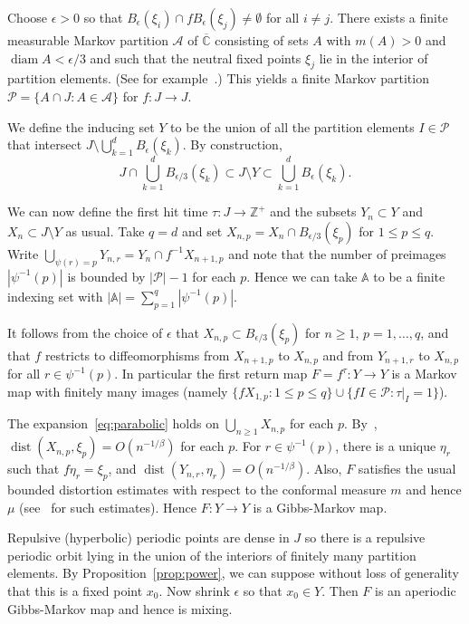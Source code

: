 \documentclass[12pt]{article}
\numberwithin{equation}{section}
\newcommand{\Z}{{\mathbb Z}}
\newcommand{\bbA}{{\mathbb A}}
\newcommand{\bC}{{\overline{\mathbb C}}}
\newcommand{\cA}{\mathcal{A}}
\newcommand{\cP}{\mathcal{P}}
\newcommand{\eps}{\epsilon}
\newcommand{\diam}{\operatorname{diam}}
\newcommand{\dist}{\operatorname{dist}}
\begin{document}
\begin{example}
Choose $\eps>0$ so that $B_\eps(\xi_i)\cap fB_\eps(\xi_j)\neq\emptyset$ for all $i\neq j$.
There exists a finite measurable Markov partition $\cA$ of $\bC$ consisting of sets $A$ with $m(A)>0$ and $\diam A<\eps/3$ and such that 
the neutral fixed points $\xi_j$ lie in the interior of partition elements.
(See for example~\cite[Section~9]{ADU93}.)
This yields a finite Markov partition $\cP=\{A\cap J: A\in\cA\}$ for $f:J\to J$.

We define the inducing set $Y$ to be the union of all the partition elements $I\in\cP$ that intersect
$J\setminus\bigcup_{k=1}^d B_\eps(\xi_k)$.
By construction, 
\[
J\cap \bigcup_{k=1}^d B_{\eps/3}(\xi_k)\subset J\setminus Y
\subset\bigcup_{k=1}^d B_\eps(\xi_k).
\]

We can now define the first hit time $\tau:J\to\Z^+$ and the subsets
$Y_n\subset Y$ and $X_n\subset J\setminus Y$ as usual.
Take $q=d$ and set
$X_{n,p}=X_n\cap B_{\eps/3}(\xi_p)$ for $1\le p\le q$.
Write 
  $\bigcup_{\psi(r)=p}Y_{n,r}=Y_n\cap f^{-1}X_{n+1,p}$
and note that the number of preimages $|\psi^{-1}(p)|$ is bounded by $|\cP|-1$ for each $p$.
Hence we can take $\bbA$ to be a finite indexing set with $|\bbA|=\sum_{p=1}^q|\psi^{-1}(p)|$. 

It follows from the choice of $\eps$ that $X_{n,p}\subset B_{\eps/3}(\xi_p)$ for $n\ge1$, $p=1,\dots,q$, and that $f$ restricts to diffeomorphisms from
$X_{n+1,p}$ to $X_{n,p}$ and from
$Y_{n+1,r}$ to $X_{n,p}$ for all $r\in\psi^{-1}(p)$.
In particular the first return map $F=f^\tau:Y\to Y$ is a Markov map with finitely many images (namely $\{fX_{1,p}: 1\le p\le q\}\cup\{fI\in\cP:\tau|_I=1\}$).

The expansion~\eqref{eq:parabolic} holds on $\bigcup_{n\ge1}X_{n,p}$ for each $p$.
By~\cite[Proposition~8.3]{ADU93}, $\dist(X_{n,p},\xi_p)=O(n^{-1/\beta})$ for each $p$.
For $r\in\psi^{-1}(p)$, there is a unique $\eta_r$ such that $f\eta_r=\xi_p$, and
$\dist(Y_{n,r},\eta_r)=O(n^{-1/\beta})$.
Also, $F$ satisfies the usual bounded distortion estimates with respect to the conformal measure $m$ and hence $\mu$ (see~\cite{DenkerUrbanski91} for such estimates). 
Hence $F:Y\to Y$ is a Gibbs-Markov map. 

Repulsive (hyperbolic) periodic points are dense in $J$ so there is a repulsive periodic orbit lying in the union of the interiors of finitely many partition elements. By Proposition~\ref{prop:power}, we can suppose without loss of generality that this is a fixed point $x_0$. Now shrink $\eps$ so that $x_0\in Y$. Then $F$ is an aperiodic Gibbs-Markov map and hence is mixing.


\end{example}
\end{document}
